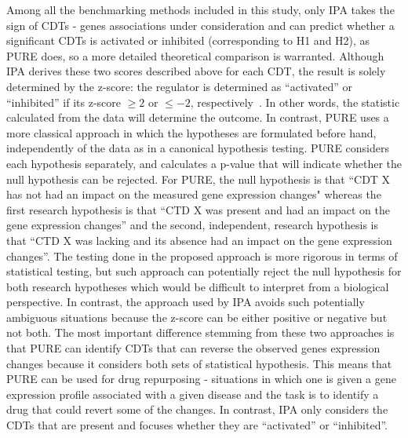 Among all the benchmarking methods included in this study, only IPA takes the sign of CDTs - genes associations under consideration and can predict whether a significant CDTs is activated or inhibited (corresponding to H1 and H2), as PURE does, so a more detailed theoretical comparison is warranted.
Although IPA derives these two scores  described above for each CDT, the result is solely determined by the z-score: the regulator is determined as ``activated''  or ``inhibited'' if its z-score $\geq 2$ or $\leq -2$, respectively~\cite{kramer2013causal}. In other words, the statistic calculated from the data will determine the outcome. In contrast, PURE uses a more classical approach in which the hypotheses are formulated before hand, independently of the data as in a canonical hypothesis testing. PURE considers each hypothesis separately, and calculates a p-value that will indicate whether the null hypothesis can be rejected. 
For PURE, the null hypothesis is that ``CDT X has not had an impact on the measured gene expression changes" whereas the first research hypothesis is that ``CTD X was present and had an impact on the gene expression changes'' and the second, independent, research hypothesis is that ``CTD X was lacking and its absence had an impact on the gene expression changes''. 
The testing done in the proposed approach is more rigorous in terms of statistical testing, but such approach can potentially reject the null hypothesis for both research hypotheses which would be difficult to interpret from a biological perspective. In contrast, the approach used by IPA avoids such potentially ambiguous situations because the z-score can be either positive or negative but not both. The most important difference stemming from these two approaches is that PURE can identify CDTs that can reverse the observed genes expression changes because it considers both sets of statistical hypothesis. This means that PURE can be used for drug repurposing - situations in which one is given a   gene expression profile associated with a given disease and the task is to identify a drug that could revert some of the changes. In contrast, IPA only considers the CDTs that are present and focuses whether they are ``activated'' or ``inhibited''. 
